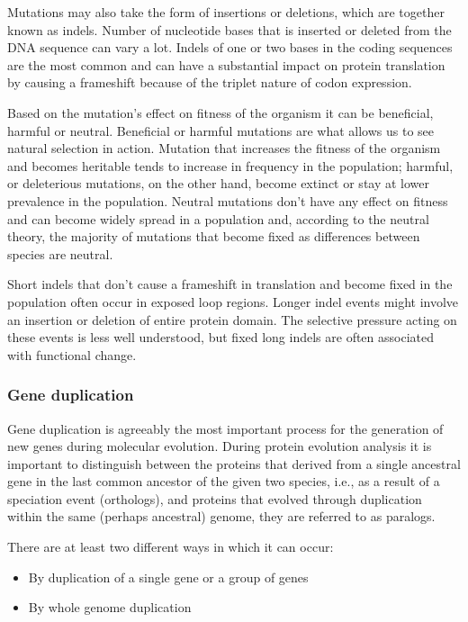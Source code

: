 \documentclass[11pt, a4paper,oneside]{report}
\begin{document}
Mutations may also take the form of insertions or deletions, which are together known as indels. Number of nucleotide bases that is inserted or deleted from the DNA sequence can vary a lot. Indels of one or two bases in the coding sequences are the most common and can have a substantial impact on protein translation by causing a frameshift because of the triplet nature of codon expression.  

Based on the mutation's effect on fitness of the organism it can be beneficial, harmful or neutral. Beneficial or harmful mutations are what allows us to see natural selection in action. Mutation that increases the fitness of the organism and becomes heritable tends to increase in frequency in the population; harmful, or deleterious mutations, on the other hand, become extinct or stay at lower prevalence in the population. Neutral mutations don't have any effect on fitness and can become widely spread in a population and, according to the neutral theory, the majority of mutations that become fixed as differences between species are neutral. 

 Short indels that don't cause a frameshift in translation and become fixed in the population often occur in exposed loop regions\cite{Kim2010}. Longer indel events might involve an insertion or deletion of entire protein domain. The selective pressure acting on these events is less well understood, but fixed long indels are often associated with functional change\cite{Pascual-Garcia2010}.

\subsubsection{Gene duplication}
Gene duplication is agreeably the most important process for the generation of new genes during molecular evolution. During protein evolution analysis it is important to distinguish between the proteins that derived from a single ancestral gene in the last common ancestor of the given two species, i.e., as a result of a speciation event (orthologs), and proteins that evolved through duplication within the same (perhaps ancestral) genome, they are referred to as paralogs\cite{Jensen2001}.

There are at least two different ways in which it can occur: 
\begin{itemize} 
\item By duplication of a single gene or a group of genes 
\item By whole genome duplication 
\end{itemize}
\end{document}
